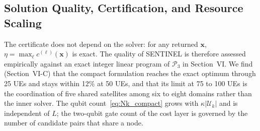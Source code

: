\subsection{Solution Quality, Certification, and Resource Scaling}

The certificate does not depend on the solver: for any returned $\mathbf{x}$, $\eta=\max_\ell c^{(\ell)}(\mathbf{x})$
is exact. The quality of SENTINEL is therefore assessed empirically against an exact integer linear program of
$\mathscr{P}_3$ in Section~VI. We find (Section~VI-C) that the compact formulation reaches the exact optimum through
25 UEs and stays within 12\% at 50 UEs, and that its limit at 75 to 100 UEs is the coordination of five shared
satellites among six to eight domains rather than the inner solver. The qubit count~\eqref{eq:Nk_compact} grows with
$\kappa|\mathscr{U}_k|$ and is independent of $L$; the two-qubit gate count of the cost layer is governed by the number
of candidate pairs that share a node.
